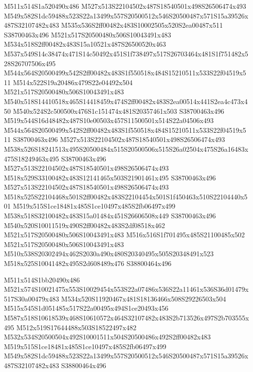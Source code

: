 \documentclass{article}
\begin{document}
\begin{multicols}{2}
M511x514S1a520490x486 M527x513S22104502x487S18540501x498S26506474x493 M549x582S1dc59488x523S22a13499x557S20500512x546S20500487x571S15a39526x487S32107482x483 M535x536S2ff00482x483S10002505x520S2ea00487x511 S38700463x496 M521x517S20500480x506S10043491x483 M534x518S2ff00482x483S15a10521x487S26500520x463 M537x549S14c38474x471S14c50492x451S1f738497x517S26703464x481S1f751482x528S26707506x495 M544x564S20500499x542S2ff00482x483S1f550518x484S15210511x533S22f04519x511 M514x522S19a20486x479S22e04492x504 M521x517S20500480x506S10043491x483 M540x518S14410518x465S14418459x474S2ff00482x483S2ea00514x441S2ea4c473x450 M540x524S2c500500x476S1c151474x481S20357461x503 S38700463x496 M519x544S16d48482x487S10e00503x457S11500501x514S22a04506x493 M544x564S20500499x542S2ff00482x483S1f550518x484S15210511x533S22f04519x511 S38700463x496 M527x513S22104502x487S18540501x498S26506474x493 M538x526S18241513x495S20500484x515S20500506x515S26a02504x475S26a16483x475S18249463x495 S38700463x496 M527x513S22104502x487S18540501x498S26506474x493 M518x529S33100482x483S12141465x503S21901461x495 S38700463x496 M527x513S22104502x487S18540501x498S26506474x493 M518x525S22104468x501S2ff00482x483S22104454x501S1f450463x510S22104440x501 M519x515S1ce18481x485S1ce10497x485S2fb06497x499 M538x518S32100482x483S15a01484x451S26606508x449 S38700463x496 M540x520S10011519x490S2ff00482x483S2df08518x462 M521x517S20500480x506S10043491x483 M516x516S1f701495x485S21100485x502 M521x517S20500480x506S10043491x483 M510x538S20302494x462S2030a490x480S20340495x505S20348491x523 M518x525S10041482x495S2d608489x476 S38800464x496

M511x514S1bb20490x486 M521x574S10021475x553S10029454x553S22a07486x536S22a11461x536S36d01479x517S30a00479x483 M534x520S11920467x481S18136466x508S29226503x504 M515x545S1d051485x517S22a00495x494S1ce20493x456 M587x518S10618539x468S10610572x464S32107482x483S2b713526x497S2b703555x495 M512x519S17644488x503S18522497x482 M532x534S20500504x492S10001511x504S20500486x492S2ff00482x483 M519x515S1ce18481x485S1ce10497x485S2fb06497x499 M549x582S1dc59488x523S22a13499x557S20500512x546S20500487x571S15a39526x487S32107482x483 S38800464x496


\end{multicols}
\end{document}
